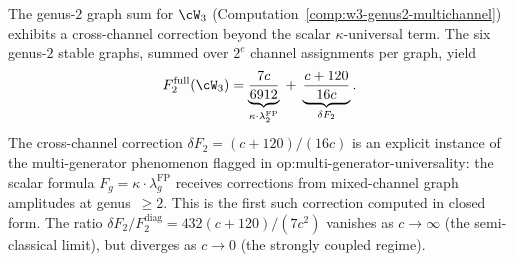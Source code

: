 \begin{remark}
\label{rem:w3-genus2-cross-channel}
The genus-$2$ graph sum for $\cW_3$
(Computation~\ref{comp:w3-genus2-multichannel}) exhibits a
cross-channel correction beyond the scalar $\kappa$-universal
term.  The six genus-$2$ stable graphs, summed over
$2^e$ channel assignments per graph, yield
\[
F_2^{\mathrm{full}}(\cW_3)
= \underbrace{\frac{7c}{6912}}_{\kappa \cdot \lambda_2^{\mathrm{FP}}}
\;+\; \underbrace{\frac{c + 120}{16c}}_{\delta F_2}.
\]
The cross-channel correction $\delta F_2 = (c{+}120)/(16c)$
is an explicit instance of the multi-generator phenomenon
flagged in op:multi-generator-universality: the scalar formula
$F_g = \kappa \cdot \lambda_g^{\mathrm{FP}}$ receives
corrections from mixed-channel graph amplitudes at genus~$\geq 2$.
This is the first such correction computed in closed form.
The ratio $\delta F_2/F_2^{\mathrm{diag}} = 432(c{+}120)/(7c^2)$
vanishes as $c \to \infty$ (the semi-classical limit), but
diverges as $c \to 0$ (the strongly coupled regime).
\end{remark}

